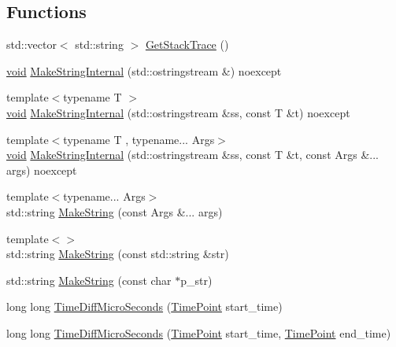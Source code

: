 \subsection*{Functions}
\begin{DoxyCompactItemize}
\item 
std\+::vector$<$ std\+::string $>$ \mbox{\hyperlink{namespaceonnxruntime_a6c642b78e49a64cd6afb3d4d5b3124f9}{Get\+Stack\+Trace}} ()
\item 
\mbox{\hyperlink{mlasi_8h_a88f941d423cb2a819b70a1358982b1a6}{void}} \mbox{\hyperlink{namespaceonnxruntime_a08e4e8fab533465b689f76e9c869d9e5}{Make\+String\+Internal}} (std\+::ostringstream \&) noexcept
\item 
{\footnotesize template$<$typename T $>$ }\\\mbox{\hyperlink{mlasi_8h_a88f941d423cb2a819b70a1358982b1a6}{void}} \mbox{\hyperlink{namespaceonnxruntime_a32faaafca5bd7d633ec333942129a6a9}{Make\+String\+Internal}} (std\+::ostringstream \&ss, const T \&t) noexcept
\item 
{\footnotesize template$<$typename T , typename... Args$>$ }\\\mbox{\hyperlink{mlasi_8h_a88f941d423cb2a819b70a1358982b1a6}{void}} \mbox{\hyperlink{namespaceonnxruntime_a43f1c79cb4166e594fe0b81ad8a79455}{Make\+String\+Internal}} (std\+::ostringstream \&ss, const T \&t, const Args \&... args) noexcept
\item 
{\footnotesize template$<$typename... Args$>$ }\\std\+::string \mbox{\hyperlink{namespaceonnxruntime_a8ccbfe2eadbffd2695f9c5784dd0c6f1}{Make\+String}} (const Args \&... args)
\item 
{\footnotesize template$<$$>$ }\\std\+::string \mbox{\hyperlink{namespaceonnxruntime_a6eea155ad1bc64ecc8e4d14c16faa3eb}{Make\+String}} (const std\+::string \&str)
\item 
std\+::string \mbox{\hyperlink{namespaceonnxruntime_aa17be809dcb43bf2bb7f97d8e2015d90}{Make\+String}} (const char $\ast$p\+\_\+str)
\item 
long long \mbox{\hyperlink{namespaceonnxruntime_af7cfb00a792e50dabc5c9a64958b362b}{Time\+Diff\+Micro\+Seconds}} (\mbox{\hyperlink{namespaceonnxruntime_a9b5a17a572f7c3cf77f4892542bd7153}{Time\+Point}} start\+\_\+time)
\item 
long long \mbox{\hyperlink{namespaceonnxruntime_a1b0e87e3cdcf125a929ecbee1ebf225c}{Time\+Diff\+Micro\+Seconds}} (\mbox{\hyperlink{namespaceonnxruntime_a9b5a17a572f7c3cf77f4892542bd7153}{Time\+Point}} start\+\_\+time, \mbox{\hyperlink{namespaceonnxruntime_a9b5a17a572f7c3cf77f4892542bd7153}{Time\+Point}} end\+\_\+time)

\end{DoxyCompactItemize}
